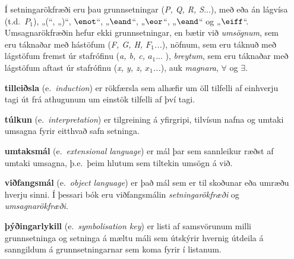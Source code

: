 \begin{enumerate}[leftmargin=35pt]
	Í setningarökfræði eru þau grunnsetningar (\emph{P, Q, R, S}...), með eða án lágvísa (t.d.\ $P_1$), „(“, „)“, $\enot$“, „$\eand$“, „$\eor$“, „$\eand$“ og „$\eiff$“. Umsagnarökfræðin hefur ekki grunnsetningar, en bætir við \emph{umsögnum}, sem eru táknaðar með hástöfum (\emph{F, G, H, $F_1$...}), nöfnum, sem eru táknuð með lágstöfum fremst úr stafrófinu (\emph{a, b, c, $a_1$}... ), \emph{breytum}, sem eru táknaðar með lágstöfum aftast úr stafrófinu (\emph{x, y, z, $x_1$...}), auk \emph{magnara}, $\forall$ og $\exists$.
	
	\item[\textbf{tilleiðsla}] (e.\ \emph{induction}) er rökfærsla sem alhæfir um öll tilfelli af einhverju tagi út frá athugunum um einstök tilfelli af því tagi.
	
	\item[\textbf{túlkun}] (e.\ \emph{interpretation}) er tilgreining á yfirgripi, tilvísun nafna og umtaki umsagna fyrir eitthvað safn setninga.
	
	\item[\textbf{umtaksmál}] (e.\ \emph{extensional language}) er mál þar sem sannleikur ræðst af umtaki umsagna, þ.e.\ þeim hlutum sem tiltekin umsögn á við.
	
	\item[\textbf{viðfangsmál}] (e.\ \emph{object language}) er það mál sem er til skoðunar eða umræðu hverju sinni. Í þessari bók eru viðfangsmálin \emph{setningarökfræði} og \emph{umsagnarökfræði}.
	
	\item[\textbf{þýðingarlykill}] (e.\ \emph{symbolisation key}) er listi af samsvörunum milli grunnsetninga og setninga á mæltu máli sem útskýrir hvernig útdeila á sanngildum á grunnsetningarnar sem koma fyrir í listanum.
 
 
 
 
 
\end{enumerate}


